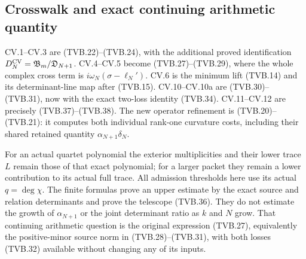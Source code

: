 \subsection{Crosswalk and exact continuing arithmetic quantity}

CV.1--CV.3 are (TVB.22)--(TVB.24), with the additional proved
identification $D_N^{\rm CV}=\mathfrak B_m/\mathfrak D_{N+1}$.
CV.4--CV.5 become (TVB.27)--(TVB.29), where the whole complex
cross term is $i\omega_N(\sigma-\ell_N')$.
CV.6 is the minimum lift (TVB.14) and its determinant-line map
after (TVB.15). CV.10--CV.10a are (TVB.30)--(TVB.31), now with
the exact two-loss identity (TVB.34). CV.11--CV.12 are precisely
(TVB.37)--(TVB.38). The new operator refinement is (TVB.20)--(TVB.21):
it computes both individual rank-one curvature costs, including
their shared retained quantity $\alpha_{N+1}\delta_N$.

For an actual quartet polynomial the exterior multiplicities and
their lower trace $L$ remain those of that exact polynomial; for a
larger packet they remain a lower contribution to its actual full
trace. All admission thresholds here use its actual $q=\deg\chi$.
The finite formulas prove an upper estimate by the exact source and
relation determinants and prove the telescope (TVB.36). They do not
estimate the growth of $\alpha_{N+1}$ or the joint determinant
ratio as $k$ and $N$ grow. That continuing arithmetic question is
the original expression (TVB.27), equivalently the positive-minor
source norm in (TVB.28)--(TVB.31), with both losses (TVB.32)
available without changing any of its inputs.

\endgroup

